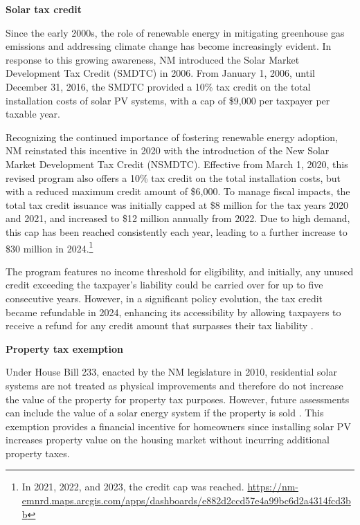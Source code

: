 \documentclass[11pt,twoside,letterpaper]{article}
\begin{document}
\textbf{Solar tax credit}

Since the early 2000s, the role of renewable energy in mitigating greenhouse gas emissions and addressing climate change has become increasingly evident. In response to this growing awareness, NM introduced the Solar Market Development Tax Credit (SMDTC) in 2006. %
From January 1, 2006, until December 31, 2016, the SMDTC provided a 10\% tax credit on the total installation costs of solar PV systems, with a cap of \$9,000 per taxpayer per taxable year. 

Recognizing the continued importance of fostering renewable energy adoption, NM reinstated this incentive in 2020 with the introduction of the New Solar Market Development Tax Credit (NSMDTC). Effective from March 1, 2020, this revised program also offers a 10\% tax credit on the total installation costs, but with a reduced maximum credit amount of \$6,000. To manage fiscal impacts, the total tax credit issuance was initially capped at \$8 million for the tax years 2020 and 2021, and increased to \$12 million annually from 2022. Due to high demand, this cap has been reached consistently each year, leading to a further increase to \$30 million in 2024.\footnote{In 2021, 2022, and 2023, the credit cap was reached. \url{https://nm-emnrd.maps.arcgis.com/apps/dashboards/e882d2ccd57e4a99bc6d2a4314fcd3bb}}

The program features no income threshold for eligibility, and initially, any unused credit exceeding the taxpayer’s liability could be carried over for up to five consecutive years. However, in a significant policy evolution, the tax credit became refundable in 2024, enhancing its accessibility by allowing taxpayers to receive a refund for any credit amount that surpasses their tax liability \parencite{nmsmdtc}.

\noindent\textbf{Property tax exemption}

Under House Bill 233, enacted by the NM legislature in 2010, residential solar systems are not treated as physical improvements and therefore do not increase the value of the property for property tax purposes. However, future assessments can include the value of a solar energy system if the property is sold \parencite{propertytax}. This exemption provides a financial incentive for homeowners since installing solar PV increases property value on the housing market without incurring additional property taxes.
\end{document}
